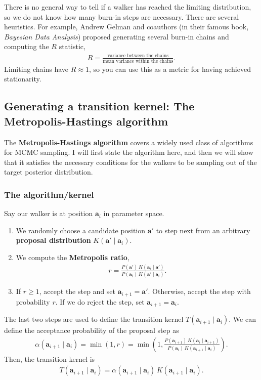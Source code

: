There is no general way to tell if a walker has reached the limiting
distribution, so we do not know how many burn-in steps are necessary.
There are several heuristics.  For example, Andrew Gelman and
coauthors (in their famous book, \textit{Bayesian Data Analysis})
proposed generating several burn-in chains and computing the $R$
statistic,
\begin{align}
R = \frac{\text{variance between the chains}}{\text{mean variance within the chains}}.
\end{align}
Limiting chains have $R \approx 1$, so you can use this as a metric
for having achieved stationarity.


\subsection{Generating a transition kernel: The Metropolis-Hastings algorithm}
The \textbf{Metropolis-Hastings algorithm} covers a widely used class
of algorithms for MCMC sampling.  I will first state the algorithm
here, and then we will show that it satisfies the necessary conditions
for the walkers to be sampling out of the target posterior
distribution.

\subsubsection{The algorithm/kernel}
Say our walker is at position $\mathbf{a}_i$ in parameter space.  
\begin{enumerate}
\item We randomly choose a candidate position $\mathbf{a}'$ to step
  next from an arbitrary \textbf{proposal distribution}
  $K(\mathbf{a}'\mid \mathbf{a}_i)$.
\item We compute the \textbf{Metropolis ratio},
  \begin{align}
    r = \frac{P(\mathbf{a}')\,K(\mathbf{a}_i\mid \mathbf{a}')}
    {P(\mathbf{a}_i)\,K(\mathbf{a}'\mid \mathbf{a}_i)}.
  \end{align}
\item If $r \ge 1$, accept the step and set
  $\mathbf{a}_{i+1} = \mathbf{a}'$.  Otherwise, accept the step with
  probability $r$.  If we do reject the step, set
  $\mathbf{a}_{i+1} = \mathbf{a}_i$.
\end{enumerate}
The last two steps are used to define the transition kernel
$T(\mathbf{a}_{i+1}\mid \mathbf{a}_i)$.  We can define the acceptance
probability of the proposal step as
\begin{align}
\alpha(\mathbf{a}_{i+1}\mid \mathbf{a}_i) = \min(1, r) = \min\left(1, \frac{P(\mathbf{a}_{i+1})\,K(\mathbf{a}_i\mid \mathbf{a}_{i+1})}
    {P(\mathbf{a}_i)\,K(\mathbf{a}_{i+1}\mid \mathbf{a}_i)}\right).
\end{align}
Then, the transition kernel is
\begin{align}
T(\mathbf{a}_{i+1}\mid \mathbf{a}_i) = \alpha(\mathbf{a}_{i+1}\mid \mathbf{a}_i)\,K(\mathbf{a}_{i+1}\mid \mathbf{a}_i).
\end{align}


